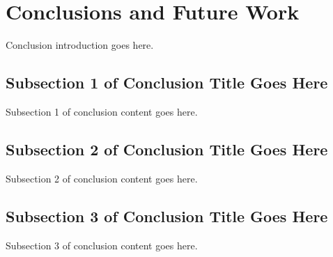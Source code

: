 \section{Conclusions and Future Work}\label{sec:conclusion}
Conclusion introduction goes here.

\subsection{Subsection 1 of Conclusion Title Goes Here}\label{subsec:conclusion1}
Subsection 1 of conclusion content goes here.

\subsection{Subsection 2 of Conclusion Title Goes Here}\label{subsec:conclusion2}
Subsection 2 of conclusion content goes here.

\subsection{Subsection 3 of Conclusion Title Goes Here}\label{subsec:conclusion3}
Subsection 3 of conclusion content goes here.
